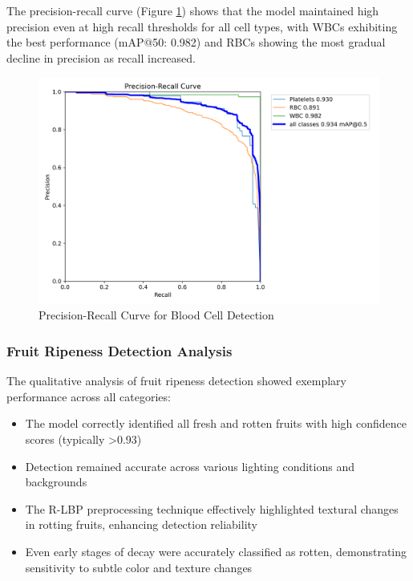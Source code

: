 \begin{multicols}{2}
The precision-recall curve (Figure \ref{fig:blood_cell_pr}) shows that the model maintained high precision even at high recall thresholds for all cell types, with WBCs exhibiting the best performance (mAP@50: 0.982) and RBCs showing the most gradual decline in precision as recall increased.

\begin{figure}[h]
\centering
\includegraphics[width=0.9\columnwidth]{../datas/blood_cell_summary_datas/blood_cells_PR_curve.png}
\caption{Precision-Recall Curve for Blood Cell Detection}
\label{fig:blood_cell_pr}
\end{figure}

\subsubsection{Fruit Ripeness Detection Analysis}

The qualitative analysis of fruit ripeness detection showed exemplary performance across all categories:

\begin{itemize}
    \item The model correctly identified all fresh and rotten fruits with high confidence scores (typically >0.93)
    \item Detection remained accurate across various lighting conditions and backgrounds
    \item The R-LBP preprocessing technique effectively highlighted textural changes in rotting fruits, enhancing detection reliability
    \item Even early stages of decay were accurately classified as rotten, demonstrating sensitivity to subtle color and texture changes
\end{itemize}


\end{multicols}
